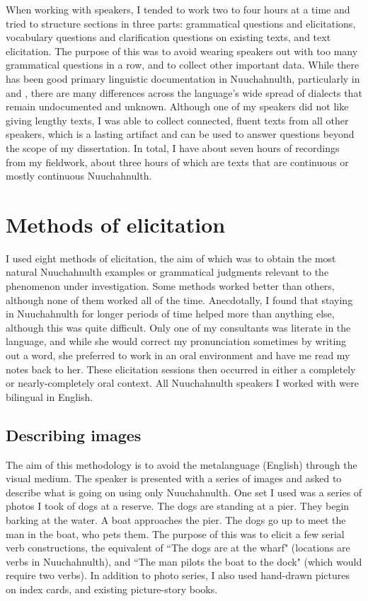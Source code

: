 When working with speakers, I tended to work two to four hours at a time and tried to structure sections in three parts: grammatical questions and elicitations, vocabulary questions and clarification questions on existing texts, and text elicitation. The purpose of this was to avoid wearing speakers out with too many grammatical questions in a row, and to collect other important data. While there has been good primary linguistic documentation in Nuuchahnulth, particularly in \citet{sapir1939} and \citet{rose1981}, there are many differences across the language's wide spread of dialects that remain undocumented and unknown. Although one of my speakers did not like giving lengthy texts, I was able to collect connected, fluent texts from all other speakers, which is a lasting artifact and can be used to answer questions beyond the scope of my dissertation. In total, I have about seven hours of recordings from my fieldwork, about three hours of which are texts that are continuous or mostly continuous Nuuchahnulth.


\section{Methods of elicitation}

I used eight methods of elicitation, the aim of which was to obtain the most natural Nuuchahnulth examples or grammatical judgments relevant to the phenomenon under investigation. Some methods worked better than others, although none of them worked all of the time. Anecdotally, I found that staying in Nuuchahnulth for longer periods of time helped more than anything else, although this was quite difficult. Only one of my consultants was literate in the language, and while she would correct my pronunciation sometimes by writing out a word, she preferred to work in an oral environment and have me read my notes back to her. These elicitation sessions then occurred in either a completely or nearly-completely oral context. All Nuuchahnulth speakers I worked with were bilingual in English.

\subsection{Describing images}

The aim of this methodology is to avoid the metalanguage (English) through the visual medium. The speaker is presented with a series of images and asked to describe what is going on using only Nuuchahnulth. One set I used was a series of photos I took of dogs at a reserve. The dogs are standing at a pier. They begin barking at the water. A boat approaches the pier. The dogs go up to meet the man in the boat, who pets them. The purpose of this was to elicit a few serial verb constructions, the equivalent of ``The dogs are at the wharf" (locations are verbs in Nuuchahnulth), and ``The man pilots the boat to the dock" (which would require two verbs). In addition to photo series, I also used hand-drawn pictures on index cards, and existing picture-story books.

